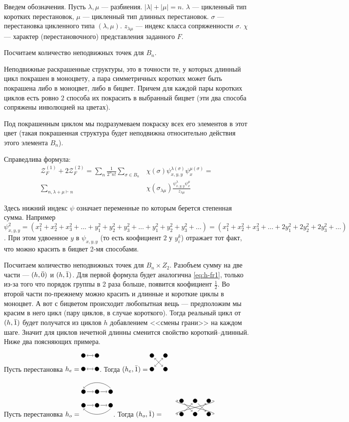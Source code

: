 Введем обозначения. Пусть $\lambda, \mu$ --- разбиения. $|\lambda| + |\mu| = n$.
$\lambda$ --- цикленный тип коротких перестановок, $\mu$ --- цикленный тип длинных перестановок. 
$\sigma$ --- перестановка цикленного типа $(\lambda, \mu)$. 
$z_{\lambda \mu}$ --- индекс класса сопряженности $\sigma$.
$\chi$ --- характер (перестановочного) представления заданного $F$.


Посчитаем количество неподвижных точек для $B_n$.
\begin{statement}
Неподвижные раскрашенные структуры, это в точности
те, у которых длинный цикл покрашен в моноцвету, а пара симметричных коротких 
может быть покрашена либо в моноцвет, либо в бицвет. Причем для каждой пары
коротких циклов есть ровно $2$ способа их покрасить в выбранный бицвет (эти
два способа сопряжены инволюцией на цветах).
\end{statement}
Под покрашенным циклом мы подразумеваем покраску всех его элементов в этот цвет
(такая покрашенная структура будет неподвижна относительно действия этого
элемента $B_n$).

\begin{statement}
Справедлива формула:
\begin{equation}
\label{eq:h-fr1}
\begin{split}
\mathcal Z_F^{(1)} + 2\mathcal Z_F^{(2)} = 
\sum_{n}\frac{1}{2^{n}n!}\sum_{\sigma \in B_n}&\chi(\sigma)
\psi_{x, y, y}^{\lambda(\sigma)} \psi_{x}^{\mu(\sigma)} = \\
\sum_{n, \lambda + \mu \vdash n}&\chi(\sigma_{\lambda \mu})
\frac{\psi_{x, y, y}^{\lambda} \psi_{x}^{\mu}}{z_{\lambda \mu}}
\end{split}
\end{equation}
\end{statement}
Здесь нижний индекс $\psi$ означает переменные по которым берется степенная
сумма. Например $\psi_{x, y, y}^2 =  (x_1^2 + x_2^2 + x_3^2 + \dots + y_1^2 +
y_2^2 + y_3^2 + \dots + y_1^2 + y_2^2 + y_3^2 + \dots) = (x_1^2 + x_2^2 + x_3^2
+ \dots + 2y_1^2 + 2y_2^2 + 2y_3^2 + \dots)$. При этом удвоенное $y$ в
$\psi_{x,y,y}$ (то есть коофициент $2$ у $y_i^k$) отражает тот факт, что можно
красить в бицвет 2-мя способами.

Посчитаем количество неподвижных точек для $B_n \times Z_2$. Разобъем
сумму на две части --- $(h, \Bar 0)$ и $(h, \Bar 1)$. Для первой формула будет
аналогична \ref{eq:h-fr1}, только из-за того что порядок группы в 2 раза больше,
появится коофициент $\frac{1}{2}$. 
Во второй части по-прежнему можно красить и длинные и короткие циклы в моноцвет.
А вот с бицветом происходит любопытная вещь --- предположим мы красим в него
цикл (пару циклов, в случае короткого). Тогда реальный цикл от $(h, \Bar 1)$
будет получатся из циклов $h$ добавлением <<смены грани>> на каждом шаге. 
Значит для циклов нечетной длинны сменится свойство короткий--длинный. Ниже
два поясняющих примера.
\begin{example}
Пусть перестановка $h_e = \dheA$.
Тогда $(h_e, \Bar 1) = \dheB$
\end{example}
\begin{example}
Пусть перестановка $h_o = \dhoA$.
Тогда $(h_o, \Bar 1) = \dhoB$
\end{example}


